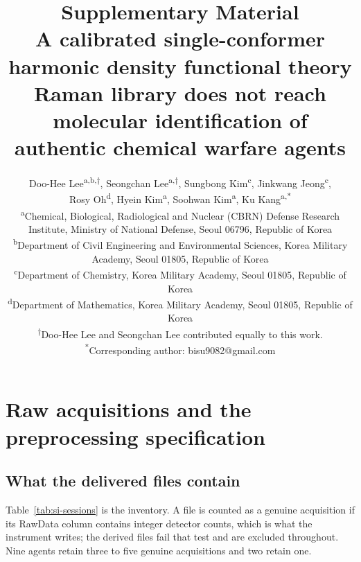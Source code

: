 \documentclass[11pt]{article}
\title{Supplementary Material\\[0.4em]
       \large A calibrated single-conformer harmonic density functional theory Raman library
       does not reach molecular identification of authentic chemical warfare agents}
\author{%
\begin{minipage}{0.95\textwidth}\centering
Doo-Hee Lee\textsuperscript{a,b,$\dagger$},
Seongchan Lee\textsuperscript{a,$\dagger$},
Sungbong Kim\textsuperscript{c},
Jinkwang Jeong\textsuperscript{c},\\
Rosy Oh\textsuperscript{d},
Hyein Kim\textsuperscript{a},
Soohwan Kim\textsuperscript{a},
Ku Kang\textsuperscript{a,*}\\[0.9em]
\normalsize
\textsuperscript{a}Chemical, Biological, Radiological and Nuclear (CBRN) Defense Research
Institute, Ministry of National Defense, Seoul 06796, Republic of Korea\\[0.15em]
\textsuperscript{b}Department of Civil Engineering and Environmental Sciences,
Korea Military Academy, Seoul 01805, Republic of Korea\\[0.15em]
\textsuperscript{c}Department of Chemistry, Korea Military Academy,
Seoul 01805, Republic of Korea\\[0.15em]
\textsuperscript{d}Department of Mathematics, Korea Military Academy,
Seoul 01805, Republic of Korea\\[0.7em]
\footnotesize
\textsuperscript{$\dagger$}Doo-Hee Lee and Seongchan Lee contributed equally to this work.\\
\textsuperscript{*}Corresponding author: bisu9082@gmail.com
\end{minipage}}
\date{}
\begin{document}
\maketitle

\tableofcontents
\clearpage

\section{Raw acquisitions and the preprocessing specification}
\label{si:preproc}

\subsection{What the delivered files contain}

Table~\ref{tab:si-sessions} is the inventory. A file is counted as a genuine acquisition
if its RawData column contains integer detector counts, which is what the instrument
writes; the derived files fail that test and are excluded throughout. Nine agents retain
three to five genuine acquisitions and two retain one.
\end{document}
